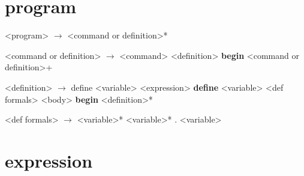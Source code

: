 \documentclass[11pt]{report}
\begin{document}
\section{program}

\begin{grammar}
  <program> $\longrightarrow$ <command or definition>*

  <command or definition> $\longrightarrow$ <command>
  \alt <definition>
  \alt \bop \textbf{begin} <command or definition>+ \bcp

  <definition> $\longrightarrow$ \bop define <variable> <expression> \bcp
  \alt \bop \textbf{define} \bop <variable> <def formals> \bcp <body> \bcp
  \alt \bop \textbf{begin} <definition>* \bcp

  <def formals> $\longrightarrow$ <variable>*
  \alt <variable>*  .  <variable>
\end{grammar}

\section{expression}
\end{document}
